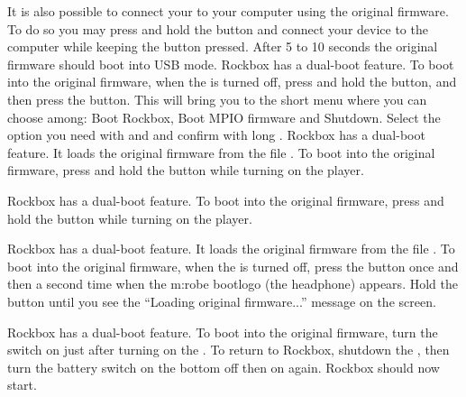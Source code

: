 {{    It is also possible to connect your \dap{} to your computer using the
    original firmware. To do so you may press and hold the \ButtonVolDown{}
    button and connect your device to the computer while keeping the
    \ButtonVolDown{} button pressed. After 5 to 10 seconds the original
    firmware should boot into USB mode.
    }
    {
    Rockbox has a dual-boot feature. To boot into the original firmware,
    when the \dap{} is turned off, press and hold the \ButtonRec{} button,
    and then press the \ButtonPlay{} button. This will bring you to the
    short menu where you can choose among: Boot Rockbox, Boot MPIO firmware
    and Shutdown. Select the option you need with \ButtonRew{} and \ButtonFF{}
    and confirm with long \ButtonPlay{}.
    }
    {
    Rockbox has a dual-boot feature. It loads the original firmware from
    the file . To boot into the original firmware,
    press and hold the \ButtonLeft{} button while turning on the player.
    }
    
    {
    Rockbox has a dual-boot feature. To boot into the original firmware,
    press and hold the \ButtonLeft{} button while turning on the player.
    }

    {
    }

    {
    Rockbox has a dual-boot feature. It loads the original firmware from
    the file . To boot into the original firmware,
    when the \dap{} is turned off, press the \ButtonPower{} button once and then 
    a second time when the m:robe bootlogo (the headphone) appears. Hold the
    \ButtonPower{} button until you see the ``Loading original firmware...'' 
    message on the screen.
    }

    {
    Rockbox has a dual-boot feature. To boot into the original firmware,
    turn the \ButtonHold{} switch on just after turning on the \dap{}.
    To return to Rockbox, shutdown the \dap{}, then turn the battery switch
    on the bottom off then on again. Rockbox should now start.
    }

}
